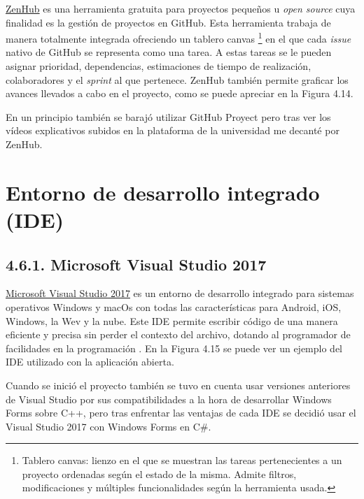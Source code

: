 \href{https://www.zenhub.com/}{ZenHub} es una herramienta gratuita para proyectos pequeños u \textit{open source} cuya finalidad es la gestión de proyectos en GitHub. Esta herramienta trabaja de manera totalmente integrada ofreciendo un tablero canvas \footnote{Tablero canvas: lienzo en el que se muestran las tareas pertenecientes a un proyecto ordenadas según el estado de la misma. Admite filtros, modificaciones y múltiples funcionalidades según la herramienta usada.} en el que cada \textit{issue} nativo de GitHub se representa como una tarea. A estas tareas se le pueden asignar prioridad, dependencias, estimaciones de tiempo de realización, colaboradores y el \textit{sprint} al que pertenece. ZenHub también permite graficar los avances llevados a cabo en el proyecto, como se puede apreciar en la Figura 4.14.


En un principio también se barajó utilizar GitHub Proyect pero tras ver los vídeos explicativos subidos en la plataforma de la universidad me decanté por ZenHub.

\section{Entorno de desarrollo integrado (IDE)}

\subsection{4.6.1. Microsoft Visual Studio 2017}

\href{https://visualstudio.microsoft.com/es/vs/}{Microsoft Visual Studio 2017} es un entorno de desarrollo integrado para sistemas operativos Windows y macOs con todas las características para Android, iOS, Windows, la Wev y la nube. Este IDE permite escribir código de una manera eficiente y precisa sin perder el contexto del archivo, dotando al programador de facilidades en la programación \cite{web:visualstudio}. En la Figura 4.15 se puede ver un ejemplo del IDE utilizado con la aplicación abierta.


Cuando se inició el proyecto también se tuvo en cuenta usar versiones anteriores de Visual Studio por sus compatibilidades a la hora de desarrollar Windows Forms sobre C++, pero tras enfrentar las ventajas de cada IDE se decidió usar el Visual Studio 2017 con Windows Forms en C\#.

